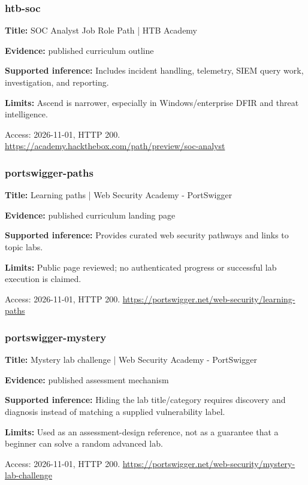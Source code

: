 \subsubsection{htb-soc}
\noindent\textbf{Title:} SOC Analyst Job Role Path | HTB Academy\par
\noindent\textbf{Evidence:} published curriculum outline\par
\noindent\textbf{Supported inference:} Includes incident handling, telemetry, SIEM query work, investigation, and reporting.\par
\noindent\textbf{Limits:} Ascend is narrower, especially in Windows/enterprise DFIR and threat intelligence.\par
\noindent Access: 2026-11-01, HTTP 200. \url{https://academy.hackthebox.com/path/preview/soc-analyst}
\subsubsection{portswigger-paths}
\noindent\textbf{Title:} Learning paths | Web Security Academy - PortSwigger\par
\noindent\textbf{Evidence:} published curriculum landing page\par
\noindent\textbf{Supported inference:} Provides curated web security pathways and links to topic labs.\par
\noindent\textbf{Limits:} Public page reviewed; no authenticated progress or successful lab execution is claimed.\par
\noindent Access: 2026-11-01, HTTP 200. \url{https://portswigger.net/web-security/learning-paths}
\subsubsection{portswigger-mystery}
\noindent\textbf{Title:} Mystery lab challenge | Web Security Academy - PortSwigger\par
\noindent\textbf{Evidence:} published assessment mechanism\par
\noindent\textbf{Supported inference:} Hiding the lab title/category requires discovery and diagnosis instead of matching a supplied vulnerability label.\par
\noindent\textbf{Limits:} Used as an assessment-design reference, not as a guarantee that a beginner can solve a random advanced lab.\par
\noindent Access: 2026-11-01, HTTP 200. \url{https://portswigger.net/web-security/mystery-lab-challenge}
